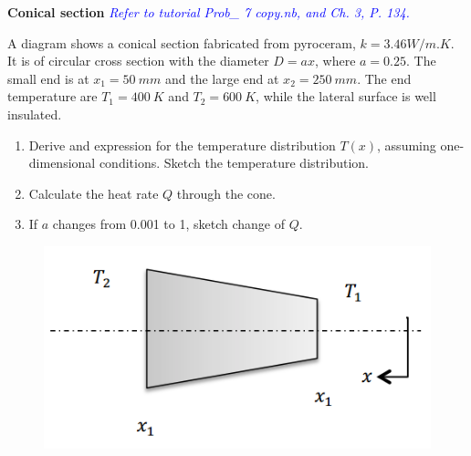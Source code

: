 \begin{example}
\textbf{Conical section} \textcolor{blue} {\emph{Refer to tutorial 
Prob\_ 7 copy.nb, and Ch. 3, P. 134.}}

A diagram shows a conical section fabricated from pyroceram, $k=3.46W/m.K$.
It is of circular cross section with the diameter $D=ax$, where $a=0.25$.
The small end is at $x_1=50~mm$ and the large end at $x_2=250~mm$.
The end temperature are $T_1=400~K$ and $T_2=600~K$, while the lateral 
surface is well insulated.
\begin{enumerate}
\item Derive and expression for the temperature distribution $T(x)$,
assuming one-dimensional conditions. Sketch the temperature distribution.
\item Calculate the heat rate $Q$ through the cone.
\item If $a$ changes from 0.001 to 1, sketch change of $Q$.
\end{enumerate}
\begin{figure}[h]
  \centering
    \includegraphics[scale=0.6]{figures/ch2/3}
\end{figure}

\end{example}


